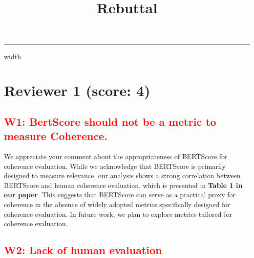 \documentclass[a4paper]{article}
\begin{document}
\title{Rebuttal}

\maketitle

\vspace{5mm}
\hrule height 0.5mm width \textwidth
\vspace{5mm}
\section{Reviewer 1 (score: 4)}
\subsection{\textcolor{red}{W1: BertScore should not be a metric to measure Coherence.}}


We appreciate your comment about the appropriateness of BERTScore for coherence evaluation. While we acknowledge that BERTScore is primarily designed to measure relevance, our analysis shows a strong correlation between BERTScore and human coherence evaluation, which is presented in \textbf{Table 1 in our paper}. This suggests that BERTScore can serve as a practical proxy for coherence in the absence of widely adopted metrics specifically designed for coherence evaluation. In future work, we plan to explore metrics tailored for coherence evaluation.



\subsection{\textcolor{red}{W2: Lack of human evaluation}}

\end{document}
